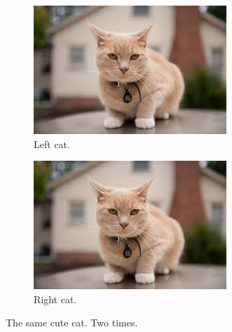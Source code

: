 \documentclass[times, utf8, diplomski]{fer}
\begin{document}
\begin{figure}[ht!]
  \centering
  \begin{subfigure}[b]{0.4\linewidth}
    \includegraphics[width=\linewidth]{images/cat.jpg}
    \caption{Left cat.}
  \end{subfigure}
  \begin{subfigure}[b]{0.4\linewidth}
    \includegraphics[width=\linewidth]{images/cat.jpg}
    \caption{Right cat.}
  \end{subfigure}
  \caption{The same cute cat. Two times.}
  \label{fig:two_cats}
\end{figure}
\end{document}
